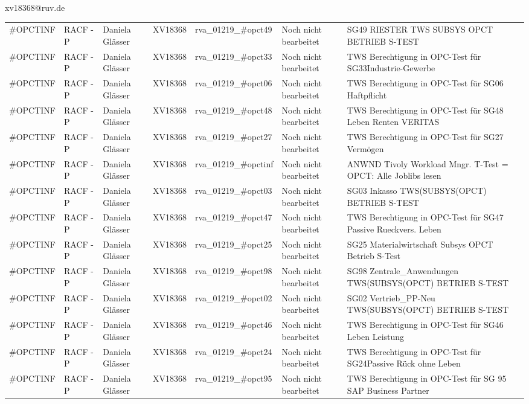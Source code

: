 \documentclass[a4paper,landscape,12pt]{letter}
\begin{document}
\begin{letter}{xv18368@ruv.de\hfill \break}
\begin{tiny}
\begin{longtable}{|p{35mm}|p{15mm}|p{25mm}|p{10mm}|p{40mm}|p{50mm}|p{50mm}|}
\#OPCTINF & RACF - P & Daniela Glässer & XV18368 & rva\_01219\_\#opct49 & Noch nicht bearbeitet & SG49 RIESTER TWS SUBSYS OPCT BETRIEB S-TEST \\
\#OPCTINF & RACF - P & Daniela Glässer & XV18368 & rva\_01219\_\#opct33 & Noch nicht bearbeitet & TWS Berechtigung in OPC-Test für SG33Industrie-Gewerbe \\
\#OPCTINF & RACF - P & Daniela Glässer & XV18368 & rva\_01219\_\#opct06 & Noch nicht bearbeitet & TWS Berechtigung in OPC-Test für SG06 Haftpflicht \\
\#OPCTINF & RACF - P & Daniela Glässer & XV18368 & rva\_01219\_\#opct48 & Noch nicht bearbeitet & TWS Berechtigung in OPC-Test für SG48 Leben Renten VERITAS \\
\#OPCTINF & RACF - P & Daniela Glässer & XV18368 & rva\_01219\_\#opct27 & Noch nicht bearbeitet & TWS Berechtigung in OPC-Test für SG27 Vermögen \\
\#OPCTINF & RACF - P & Daniela Glässer & XV18368 & rva\_01219\_\#opctinf & Noch nicht bearbeitet & ANWND Tivoly Workload Mngr. T-Test = OPCT: Alle Joblibs lesen \\
\#OPCTINF & RACF - P & Daniela Glässer & XV18368 & rva\_01219\_\#opct03 & Noch nicht bearbeitet & SG03 Inkasso TWS(SUBSYS(OPCT) BETRIEB S-TEST \\
\#OPCTINF & RACF - P & Daniela Glässer & XV18368 & rva\_01219\_\#opct47 & Noch nicht bearbeitet & TWS Berechtigung in OPC-Test für SG47 Passive Rueckvers. Leben \\
\#OPCTINF & RACF - P & Daniela Glässer & XV18368 & rva\_01219\_\#opct25 & Noch nicht bearbeitet & SG25 Materialwirtschaft Subsys OPCT Betrieb S-Test \\
\#OPCTINF & RACF - P & Daniela Glässer & XV18368 & rva\_01219\_\#opct98 & Noch nicht bearbeitet & SG98 Zentrale\_Anwendungen TWS(SUBSYS(OPCT) BETRIEB S-TEST \\
\#OPCTINF & RACF - P & Daniela Glässer & XV18368 & rva\_01219\_\#opct02 & Noch nicht bearbeitet & SG02 Vertrieb\_PP-Neu TWS(SUBSYS(OPCT) BETRIEB S-TEST \\
\#OPCTINF & RACF - P & Daniela Glässer & XV18368 & rva\_01219\_\#opct46 & Noch nicht bearbeitet & TWS Berechtigung in OPC-Test für SG46 Leben Leistung \\
\#OPCTINF & RACF - P & Daniela Glässer & XV18368 & rva\_01219\_\#opct24 & Noch nicht bearbeitet & TWS Berechtigung in OPC-Test für SG24Passive Rück ohne Leben \\
\#OPCTINF & RACF - P & Daniela Glässer & XV18368 & rva\_01219\_\#opct95 & Noch nicht bearbeitet &  TWS Berechtigung in OPC-Test für SG 95 SAP Business Partner \\

\end{longtable}
\end{tiny}
\end{letter}
\end{document}
